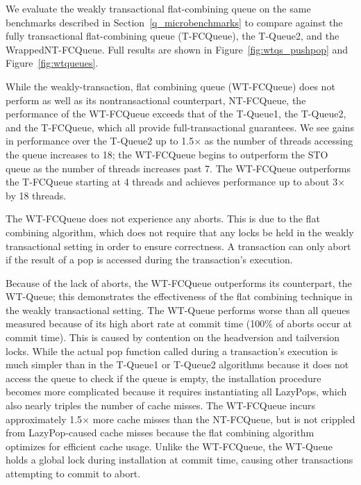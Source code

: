 We evaluate the weakly transactional flat-combining queue on the same benchmarks described in Section~\ref{q_microbenchmarks} to compare against the fully transactional flat-combining queue (T-FCQueue), the T-Queue2, and the WrappedNT-FCQueue. Full results are shown in Figure~\ref{fig:wtqs_pushpop} and Figure~\ref{fig:wtqueues}.

While the weakly-transaction, flat combining queue (WT-FCQueue) does not perform as well as its nontransactional counterpart, NT-FCQueue, the performance of the WT-FCQueue exceeds that of the T-Queue1, the T-Queue2, and the T-FCQueue, which all provide full-transactional guarantees. We see gains in performance over the T-Queue2 up to 1.5$\times$ as the number of threads accessing the queue increases to 18; the WT-FCQueue begins to outperform the STO queue as the number of threads increases past 7. The WT-FCQueue outperforms the T-FCQueue starting at 4 threads and achieves performance up to about 3$\times$ by 18 threads.
 
The WT-FCQueue does not experience any aborts. This is due to the flat combining algorithm, which does not require that any locks be held in the weakly transactional setting in order to ensure correctness. A transaction can only abort if the result of a pop is accessed during the transaction's execution.

Because of the lack of aborts, the WT-FCQueue outperforms its counterpart, the WT-Queue; this demonstrates the effectiveness of the flat combining technique in the weakly transactional setting. The WT-Queue performs worse than all queues measured because of its high abort rate at commit time (100\% of aborts occur at commit time). This is caused by contention on the headversion and tailversion locks. While the actual pop function called during a transaction's execution is much simpler than in the T-Queue1 or T-Queue2 algorithms because it does not access the queue to check if the queue is empty, the installation procedure becomes more complicated because it requires instantiating all LazyPops, which also nearly triples the number of cache misses. The WT-FCQueue incurs approximately 1.5$\times$ more cache misses than the NT-FCQueue, but is not crippled from LazyPop-caused cache misses because the flat combining algorithm optimizes for efficient cache usage. Unlike the WT-FCQueue, the WT-Queue holds a global lock during installation at commit time, causing other transactions attempting to commit to abort.
